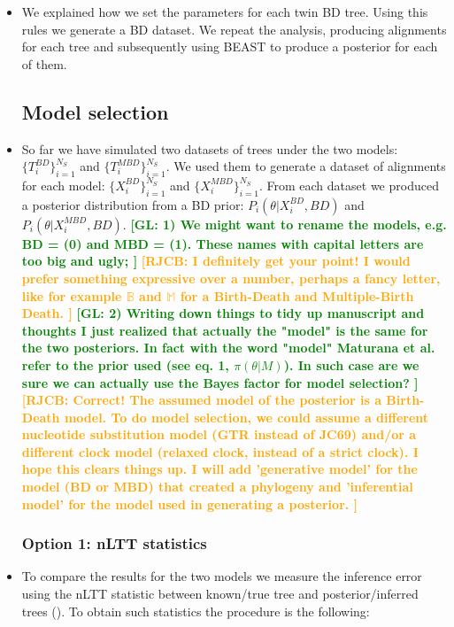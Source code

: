 \documentclass{article}
\newcommand*\richel[1]{\textcolor{orange}{\textbf{[RJCB: #1]}}}
\newcommand*\gio[1]{\textcolor{green}{\textbf{[GL: #1]}}}
\begin{document}
\begin{itemize}
\item We explained how we set the parameters for each twin BD tree. Using this rules we generate a BD dataset. We repeat the analysis, producing alignments for each tree and subsequently using BEAST to produce a posterior for each of them.

\subsection{Model selection}

\item So far we have simulated two datasets of trees under the two models: 
$\{T_{i}^{BD}\}_{i=1}^{N_{S}}$ and $\{T_{i}^{MBD}\}_{i=1}^{N_{S}}$.
We used them to generate a dataset of alignments for each model: $\{X^{BD}_{i}\}_{i=1}^{N_{S}}$ and $\{X^{MBD}_{i}\}_{i=1}^{N_{S}}$. From each dataset we produced a posterior distribution from a BD prior: 
$P_{i}(\theta | X^{BD}_{i}, BD)$ and $P_{i}(\theta | X^{MBD}_{i}, BD)$.
\gio{
  1) We might want to rename the models, e.g. BD = (0) and MBD = (1). These names with capital letters are too big and ugly;
}
\richel{
  I definitely get your point! 
  I would prefer something expressive over a number, perhaps a fancy letter, like
  for example $\mathbb{B}$ and $\mathbb{M}$ 
  for a Birth-Death and Multiple-Birth Death. 
}
\gio{
2) Writing down things to tidy up manuscript and thoughts I just realized that 
  actually the "model" is the same for the two posteriors. 
  In fact with the word "model" Maturana et al. refer to the prior 
  used (see eq. 1, $\pi(\theta | M)$). In such case are we sure we can actually 
  use the Bayes factor for model selection?
}
\richel{
  Correct! The assumed model of the posterior is a Birth-Death model. To do
  model selection, we could assume a different nucleotide substitution 
  model (GTR instead of JC69) and/or a different clock model (relaxed clock,
  instead of a strict clock). I hope this clears things up. I will add
  'generative model' for the model (BD or MBD) that created a phylogeny
  and 'inferential model' for the model used in generating a posterior.
}

\subsubsection{Option 1: nLTT statistics}
\item To compare the results for the two models we measure the inference 
error using the nLTT statistic between known/true tree and 
posterior/inferred trees (\cite{nltt}). 
To obtain such statistics the procedure is the following:


\end{itemize}
\end{document}
